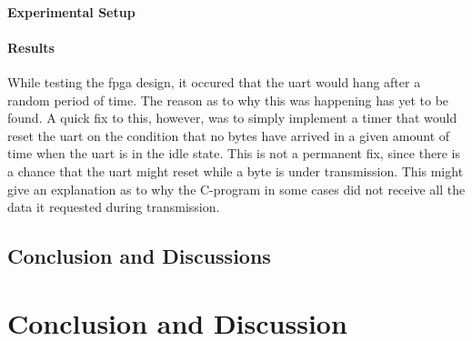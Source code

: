 \documentclass[main.tex]{subfiles}
\begin{document}
\subsubsection{Experimental Setup}

\subsubsection{Results}

While testing the \gls{fpga} design, it occured that the \gls{uart} would hang after a random period of time. The reason as to why this was happening has yet to be found. A quick fix to this, however, was to simply implement a timer that would reset the \gls{uart} on the condition that no bytes have arrived in a given amount of time when the \gls{uart} is in the idle state. This is not a permanent fix, since there is a chance that the \gls{uart} might reset while a byte is under transmission. This might give an explanation as to why the C-program in some cases did not receive all the data it requested during transmission.

\section{Conclusion and Discussions}

\chapter{Conclusion and Discussion}
\end{document}

